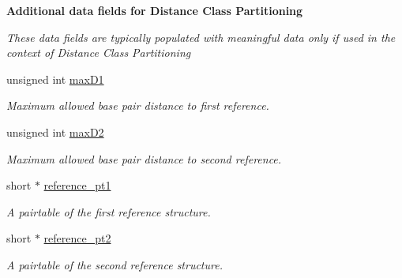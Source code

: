\begin{Indent}\textbf{ Additional data fields for Distance Class Partitioning}\par
{\em These data fields are typically populated with meaningful data only if used in the context of Distance Class Partitioning }\begin{DoxyCompactItemize}
\item 
\mbox{\label{group__fold__compound_a426305721b16023f2f3247f7354d2c46}} 
unsigned int \mbox{\hyperlink{group__fold__compound_a426305721b16023f2f3247f7354d2c46}{max\+D1}}
\begin{DoxyCompactList}\small\item\em Maximum allowed base pair distance to first reference. \end{DoxyCompactList}\item 
\mbox{\label{group__fold__compound_a38695774fd396c892f9a70d39978b231}} 
unsigned int \mbox{\hyperlink{group__fold__compound_a38695774fd396c892f9a70d39978b231}{max\+D2}}
\begin{DoxyCompactList}\small\item\em Maximum allowed base pair distance to second reference. \end{DoxyCompactList}\item 
\mbox{\label{group__fold__compound_aa279ba4bd0ff541d435d3a049687f3ac}} 
short $\ast$ \mbox{\hyperlink{group__fold__compound_aa279ba4bd0ff541d435d3a049687f3ac}{reference\+\_\+pt1}}
\begin{DoxyCompactList}\small\item\em A pairtable of the first reference structure. \end{DoxyCompactList}\item 
\mbox{\label{group__fold__compound_a926ad253f5f0eed642bc227493d0278d}} 
short $\ast$ \mbox{\hyperlink{group__fold__compound_a926ad253f5f0eed642bc227493d0278d}{reference\+\_\+pt2}}
\begin{DoxyCompactList}\small\item\em A pairtable of the second reference structure. \end{DoxyCompactList}\item 
\mbox{\label{group__fold__compound_a62a8d4ab8dadffbf09da917adff6c71e}} 

\end{DoxyCompactItemize}
\end{Indent}
